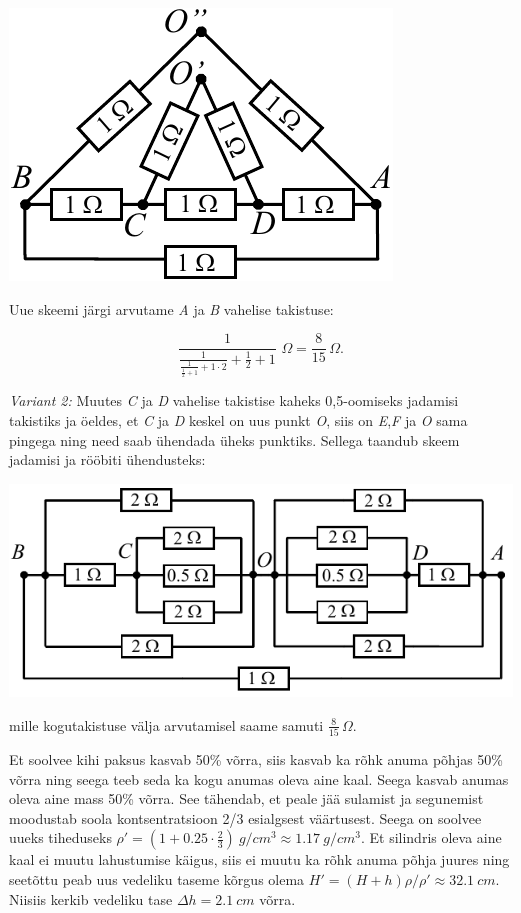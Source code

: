 \documentclass[10pt]{article}
\begin{document}
\begin{center}
\includegraphics[scale=0.8]{2020-v3g-05-yl4.pdf}\\
\end{center}
Uue skeemi järgi arvutame \emph{A} ja \emph{B} vahelise takistuse:

$$ \frac{1}{\frac{1}{\displaystyle{\frac{1}{\frac{1}{2}+1} + 1 \cdot 2}}+\frac{1}{2}  + 1} \,\, \SI{}\Omega =\frac{8}{15} \, \SI{}\Omega.$$

\emph{Variant 2:} Muutes \emph{C} ja \emph{D} vahelise takistise kaheks 0,5-oomiseks jadamisi takistiks ja öeldes, et \emph{C} ja \emph{D} keskel on uus punkt \emph{O}, siis on \emph{E},\emph{F} ja \emph{O} sama pingega ning need saab ühendada üheks punktiks. Sellega taandub skeem jadamisi ja rööbiti ühendusteks:
\begin{center}
\includegraphics[scale=0.9]{2020-v3g-05-yl5.pdf}\\
\end{center}
mille kogutakistuse välja arvutamisel saame samuti $\frac{8}{15} \, \SI{}\Omega$.
\probend
\bigskip


\solu
Et soolvee kihi paksus kasvab 50\% võrra, siis kasvab ka rõhk anuma põhjas 50\% võrra ning seega teeb seda ka kogu anumas oleva aine kaal. Seega kasvab anumas oleva aine mass 50\% võrra. See tähendab, et peale jää sulamist ja segunemist moodustab soola kontsentratsioon 2/3 esialgsest väärtusest. Seega on soolvee uueks tiheduseks $\rho'=(1+0.25\cdot \frac 23)\SI{}{g/cm^3}\approx \SI{1.17}{g/cm^3}$. Et silindris oleva aine kaal ei muutu lahustumise käigus, siis ei muutu ka rõhk anuma põhja juures ning seetõttu peab uus vedeliku taseme kõrgus olema $H'=(H+h)\rho/\rho'\approx \SI{32.1}{cm}$. Niisiis kerkib vedeliku tase  $\Delta h=\SI{2.1}{cm}$ võrra.
\probend
\bigskip
\end{document}

